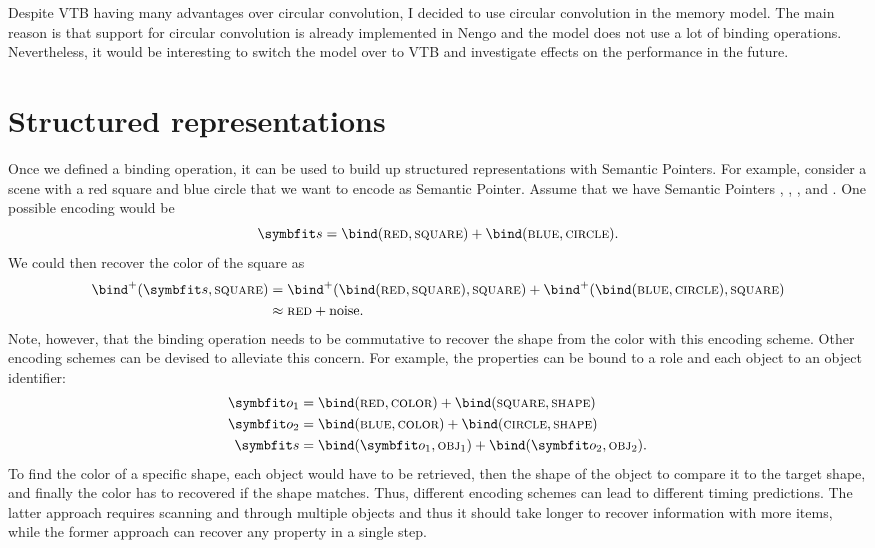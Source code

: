 Despite VTB having many advantages over circular convolution, I decided to use circular convolution in the memory model.
The main reason is that support for circular convolution is already implemented in Nengo and the model does not use a lot of binding operations.
Nevertheless, it would be interesting to switch the model over to VTB and investigate effects on the performance in the future.


\section{Structured representations}
Once we defined a binding operation, it can be used to build up structured representations with Semantic Pointers.
For example, consider a scene with a red square and blue circle that we want to encode as Semantic Pointer.
Assume that we have Semantic Pointers , , , and .
One possible encoding would be
\begin{equation}
    \vc s = \bind(\spc{red}, \spc{square}) + \bind(\spc{blue}, \spc{circle}) \text{.}
\end{equation}
We could then recover the color of the square as
\begin{align}
    \bind^+(\vc s, \spc{square}) &= \bind^+(\bind(\spc{red}, \spc{square}), \spc{square}) + \bind^+(\bind(\spc{blue}, \spc{circle}), \spc{square}) \\
    &\approx \spc{red} + \mathrm{noise} \text{.}
\end{align}
Note, however, that the binding operation needs to be commutative to recover the shape from the color with this encoding scheme.
Other encoding schemes can be devised to alleviate this concern.
For example, the properties can be bound to a role and each object to an object identifier:
\begin{align}
    \vc o_1 &= \bind(\spc{red}, \spc{color}) + \bind(\spc{square}, \spc{shape}) \\
    \vc o_2 &= \bind(\spc{blue}, \spc{color}) + \bind(\spc{circle}, \spc{shape}) \\
    \vc s &= \bind(\vc o_1, \spc{obj}_1) + \bind(\vc o_2, \spc{obj}_2) \text{.}
\end{align}
To find the color of a specific shape, each object would have to be retrieved, then the shape of the object to compare it to the target shape, and finally the color has to recovered if the shape matches.
Thus, different encoding schemes can lead to different timing predictions.
The latter approach requires scanning and through multiple objects and thus it should take longer to recover information with more items, while the former approach can recover any property in a single step.
